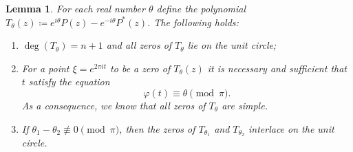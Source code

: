 \documentclass[reqno, a4paper]{amsart}
\theoremstyle{plain}
\newtheorem{lemma}[theorem]{Lemma}
\theoremstyle{definition}
\theoremstyle{remarkstyle}
\numberwithin{equation}{section}
\begin{document}
\begin{lemma}\label{lem:interlacing-property-of-zeros}
    For each  real number $\theta$ define the polynomial  $T_\theta(z)\coloneqq e^{i\theta} P(z)- e^{-i\theta}P^*(z)$. The following holds:
    \begin{enumerate}[label=\textnormal{(\roman*)}]
        \item $\deg(T_\theta)=n+1$ and all zeros of $T_\theta$ lie on the unit circle;
        \item For a point  $\xi=e^{2\pi i t}$ to be a zero of $T_\theta(z)$ it is necessary and sufficient that $t$ satisfy the equation
        \begin{equation}\label{eq:modular-equation-for-the-phase}
            \varphi(t)\equiv \theta \pmod{\pi}.
        \end{equation}
        As a consequence, we know that all zeros of $T_\theta$ are simple.
        \item If $\theta_1-\theta_2\not \equiv 0 \pmod{\pi}$, then the zeros of $T_{\theta_1}$ and $T_{\theta_2}$ interlace on the unit circle.
    \end{enumerate}
\end{lemma}
\end{document}
